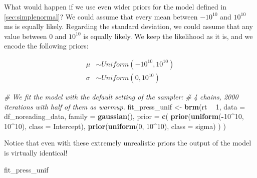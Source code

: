 \documentclass[12pt,]{krantz}
\newenvironment{Shaded}{\begin{snugshade}}{\end{snugshade}}
\newcommand{\CommentTok}[1]{\textcolor[rgb]{0.56,0.35,0.01}{\textit{#1}}}
\newcommand{\DataTypeTok}[1]{\textcolor[rgb]{0.13,0.29,0.53}{#1}}
\newcommand{\DecValTok}[1]{\textcolor[rgb]{0.00,0.00,0.81}{#1}}
\newcommand{\KeywordTok}[1]{\textcolor[rgb]{0.13,0.29,0.53}{\textbf{#1}}}
\newcommand{\NormalTok}[1]{#1}
\newcommand{\OperatorTok}[1]{\textcolor[rgb]{0.81,0.36,0.00}{\textbf{#1}}}
\newcommand{\StringTok}[1]{\textcolor[rgb]{0.31,0.60,0.02}{#1}}
\theoremstyle{definition}
\theoremstyle{definition}
\theoremstyle{definition}
\theoremstyle{remark}
\begin{document}
What would happen if we use even wider priors for the model defined in \ref{sec:simplenormal}? We could assume that every mean between \(-10^{10}\) and \(10^{10}\) ms is equally likely. Regarding the standard deviation, we could assume that any value between \(0\) and \(10^{10}\) is equally likely. We keep the likelihood as it is, and we encode the following priors:

\begin{equation}
\begin{aligned}
\mu &\sim Uniform(-10^{10}, 10^{10}) \\
\sigma &\sim Uniform(0,  10^{10}) 
\end{aligned}
\label{eq:rtpriorsflat}
\end{equation}

\begin{Shaded}
\begin{Highlighting}[]
\CommentTok{# We fit the model with the default setting of the sampler:}
\CommentTok{# 4 chains, 2000 iterations with half of them as warmup.}
\NormalTok{fit_press_unif <-}\StringTok{ }\KeywordTok{brm}\NormalTok{(rt }\OperatorTok{~}\StringTok{ }\DecValTok{1}\NormalTok{,}
  \DataTypeTok{data =}\NormalTok{ df_noreading_data,}
  \DataTypeTok{family =} \KeywordTok{gaussian}\NormalTok{(),}
  \DataTypeTok{prior =} \KeywordTok{c}\NormalTok{(}
    \KeywordTok{prior}\NormalTok{(}\KeywordTok{uniform}\NormalTok{(}\OperatorTok{-}\DecValTok{10}\OperatorTok{^}\DecValTok{10}\NormalTok{, }\DecValTok{10}\OperatorTok{^}\DecValTok{10}\NormalTok{), }\DataTypeTok{class =}\NormalTok{ Intercept),}
    \KeywordTok{prior}\NormalTok{(}\KeywordTok{uniform}\NormalTok{(}\DecValTok{0}\NormalTok{, }\DecValTok{10}\OperatorTok{^}\DecValTok{10}\NormalTok{), }\DataTypeTok{class =}\NormalTok{ sigma)}
\NormalTok{  )}
\NormalTok{)}
\end{Highlighting}
\end{Shaded}

Notice that even with these extremely unrealistic priors the output of the model is virtually identical!

\begin{Shaded}
\begin{Highlighting}[]
\NormalTok{fit_press_unif}
\end{Highlighting}
\end{Shaded}
\end{document}
